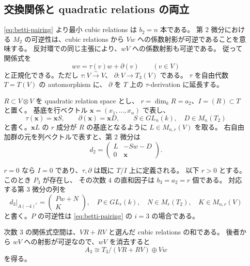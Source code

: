 \subsection{交換関係と quadratic relations の両立}

\eqref{eq:betti-pairing} より最小 cubic relations は \(b_2=n\) 本である。
第 2 微分における \(M_2\) の可逆性は、cubic relations から
\(Vw\) への係数射影が可逆であることを意味する。
反対環での同じ主張により、\(wV\) への係数射影も可逆である。
従って関係式を
\begin{equation}\label{eq:cubic-normal}
wv=\tau(v)w+\partial(v)\qquad(v\in V)
\end{equation}
と正規化できる。ただし \(\tau:V\xrightarrow{\sim}V\)、
\(\partial:V\to T_3(V)\) である。
\(\tau\) を自由代数 \(T=T(V)\) の automorphism に、
\(\partial\) を \(T\) 上の \(\tau\)-derivation に延長する。

\(R\subset V\otimes V\) を quadratic relation space とし、
\(r=\dim_kR=a_2\)、\(I=(R)\subset T\) と置く。
基底を行ベクトル \(\mathbf x=(x_1,\ldots,x_n)\) で表し、
\[
\tau(\mathbf x)=\mathbf xS,\qquad
\partial(\mathbf x)=\mathbf xD,
\qquad S\in GL_n(k),\quad D\in M_n(T_2)
\]
と書く。\(\mathbf xL\) の \(r\) 成分が \(R\) の基底となるように
\(L\in M_{n,r}(V)\) を取る。
右自由加群の元を列ベクトルで表すと、第 2 微分は
\begin{equation}\label{eq:d2-matrix}
d_2=
\begin{pmatrix}L&-Sw-D\\0&\mathbf x\end{pmatrix}.
\end{equation}

\(r=0\) なら \(I=0\) であり、\(\tau,\partial\) は既に \(T/I\) 上に定義される。
以下 \(r>0\) とする。このとき \(P_3\) が存在し、
その次数 \(4\) の直和因子は \(b_3=a_2=r\) 個である。
対応する第 3 微分の列を
\begin{equation}\label{eq:d3-matrix}
d_3\big|_{A(-4)^r}=
\begin{pmatrix}Pw+N\\K\end{pmatrix},
\quad
P\in GL_r(k),\quad N\in M_r(T_2),\quad K\in M_{n,r}(V)
\end{equation}
と書く。\(P\) の可逆性は \eqref{eq:betti-pairing} の \(i=3\) の場合である。

次数 \(3\) の関係式空間は、\(VR+RV\) と選んだ cubic relations の和である。
後者から \(wV\) への射影が可逆なので、\(wV\) を消去すると
\begin{equation}\label{eq:degree-three-splitting}
A_3\cong T_3/(VR+RV)\oplus Vw
\end{equation}
を得る。

